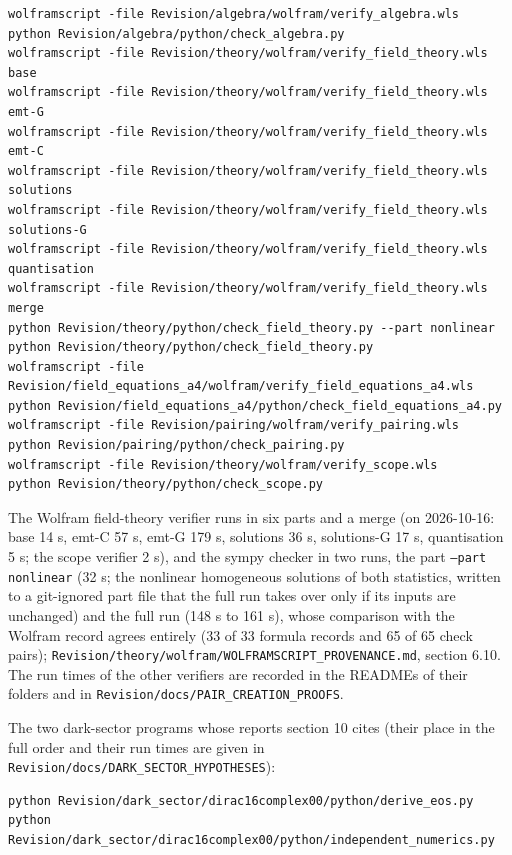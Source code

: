 \documentclass[11pt]{article}
\begin{document}
\begin{Verbatim}[fontsize=\small]
wolframscript -file Revision/algebra/wolfram/verify_algebra.wls
python Revision/algebra/python/check_algebra.py
wolframscript -file Revision/theory/wolfram/verify_field_theory.wls base
wolframscript -file Revision/theory/wolfram/verify_field_theory.wls emt-G
wolframscript -file Revision/theory/wolfram/verify_field_theory.wls emt-C
wolframscript -file Revision/theory/wolfram/verify_field_theory.wls solutions
wolframscript -file Revision/theory/wolfram/verify_field_theory.wls solutions-G
wolframscript -file Revision/theory/wolfram/verify_field_theory.wls quantisation
wolframscript -file Revision/theory/wolfram/verify_field_theory.wls merge
python Revision/theory/python/check_field_theory.py --part nonlinear
python Revision/theory/python/check_field_theory.py
wolframscript -file Revision/field_equations_a4/wolfram/verify_field_equations_a4.wls
python Revision/field_equations_a4/python/check_field_equations_a4.py
wolframscript -file Revision/pairing/wolfram/verify_pairing.wls
python Revision/pairing/python/check_pairing.py
wolframscript -file Revision/theory/wolfram/verify_scope.wls
python Revision/theory/python/check_scope.py
\end{Verbatim}

The Wolfram field-theory verifier runs in six parts and a merge (on 2026-10-16: base 14 s, emt-C 57 s, emt-G 179 s, solutions 36 s, solutions-G 17 s, quantisation 5 s; the scope verifier 2 s), and the sympy checker in two runs, the part \texttt{--part n\allowbreak{}onlinear} (32 s; the nonlinear homogeneous solutions of both statistics, written to a git-ignored part file that the full run takes over only if its inputs are unchanged) and the full run (148 s to 161 s), whose comparison with the Wolfram record agrees entirely (33 of 33 formula records and 65 of 65 check pairs); \texttt{Revision\allowbreak{}/theory/\allowbreak{}wolfram/\allowbreak{}WOLFRAMS\allowbreak{}CRIPT\_PR\allowbreak{}OVENANCE\allowbreak{}.md}, section 6.10. The run times of the other verifiers are recorded in the READMEs of their folders and in \texttt{Revision\allowbreak{}/docs/PA\allowbreak{}IR\_CREAT\allowbreak{}ION\_PROO\allowbreak{}FS}.

The two dark-sector programs whose reports section 10 cites (their place in the full order and their run times are given in \texttt{Revision\allowbreak{}/docs/DA\allowbreak{}RK\_SECTO\allowbreak{}R\_HYPOTH\allowbreak{}ESES}):

\begin{Verbatim}[fontsize=\small]
python Revision/dark_sector/dirac16complex00/python/derive_eos.py
python Revision/dark_sector/dirac16complex00/python/independent_numerics.py
\end{Verbatim}
\end{document}
